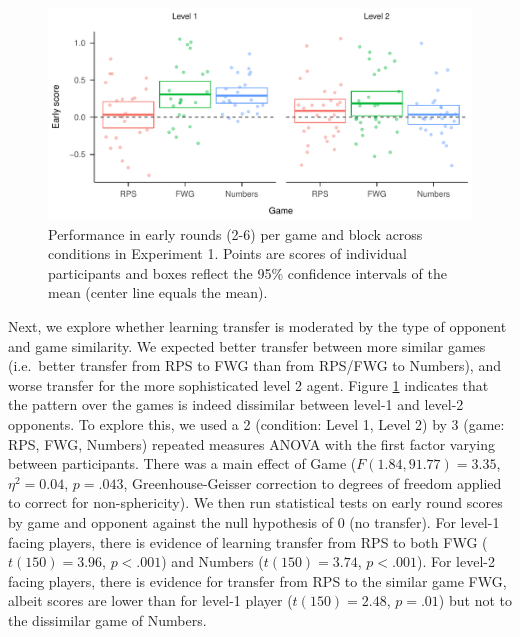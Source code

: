 \documentclass[man,floatsintext]{apa6}
\begin{document}
\begin{figure}

{\centering \includegraphics{paper_draft_2021_files/figure-latex/exp1-early-score-by-opp-1} 

}

\caption{\label{ref:figure4-caption}Performance in early rounds (2-6) per game and block across conditions in Experiment 1. Points are scores of individual participants and boxes reflect the 95\% confidence intervals of the mean (center line equals the mean).}\label{fig:exp1-early-score-by-opp}
\end{figure}

Next, we explore whether learning transfer is moderated by the type of opponent and game similarity. We expected better transfer between more similar games (i.e.~better transfer from RPS to FWG than from RPS/FWG to Numbers), and worse transfer for the more sophisticated level 2 agent. Figure \ref{fig:exp1-early-score-by-opp} indicates that the pattern over the games is indeed dissimilar between level-1 and level-2 opponents. To explore this, we used a 2 (condition: Level 1, Level 2) by 3 (game: RPS, FWG, Numbers) repeated measures ANOVA with the first factor varying between participants. There was a main effect of Game (\(F(1.84,91.77) = 3.35\), \(\eta^{2} = 0.04\), \(p = .043\), Greenhouse-Geisser correction to degrees of freedom applied to correct for non-sphericity). We then run statistical tests on early round scores by game and opponent against the null hypothesis of 0 (no transfer). For level-1 facing players, there is evidence of learning transfer from RPS to both FWG (\(t(150) = 3.96\), \(p < .001\)) and Numbers (\(t(150) = 3.74\), \(p < .001\)). For level-2 facing players, there is evidence for transfer from RPS to the similar game FWG, albeit scores are lower than for level-1 player (\(t(150) = 2.48\), \(p = .01\)) but not to the dissimilar game of Numbers.
\end{document}
